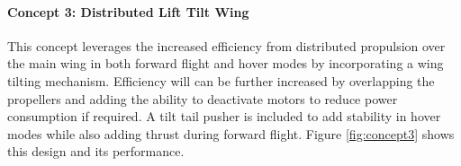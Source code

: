 \paragraph{Concept 3: Distributed Lift Tilt Wing}
This concept leverages the increased efficiency from distributed propulsion over the main wing in both forward flight and hover modes by incorporating a wing tilting mechanism. Efficiency will can be further increased by overlapping the propellers and adding the ability to deactivate motors to reduce power consumption if required. A tilt tail pusher is included to add stability in hover modes while also adding thrust during forward flight. Figure \ref{fig:concept3} shows this design and its performance.


